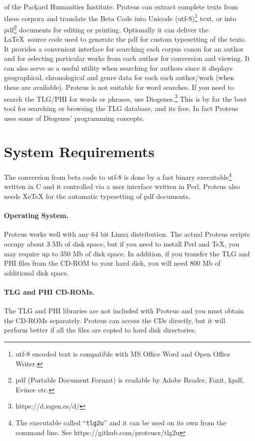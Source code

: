 \documentclass[11pt,a4paper]{article}
\begin{document}
  of the Packard Humanities Institute.
  Proteus can extract complete texts from these corpora
  and translate the Beta Code into Unicode (utf-8)\footnote{utf-8 encoded
  text is compatible with MS Office Word and Open Office Writer.}
  text, or into pdf\footnote{ pdf (Portable Document Format)
  is readable by Adobe Reader, Foxit, kpdf, Evince etc.}
  documents for editing or printing. Optionally it can deliver the \LaTeX\
  source code used to generate the pdf for custom typesetting of the texts.
  It provides a convenient
  interface for searching each corpus canon for an author and for selecting
  particular works from each author for conversion and viewing.
  It can also serve as a useful utility when searching for
  authors since it displays geographical, chronological and genre
  data for each each author/work (when these are available).
  Proteus is not suitable for word searches.  If you need to search the
  TLG/PHI for words or phrases, use
  Diogenes.\footnote{https://d.iogen.es/d/}
  This is by far the best tool for searching or browsing the TLG database,
  and its free. In fact Proteus uses some of Diogenes' programming concepts.
\section{System Requirements}
  The conversion from beta code to utf-8 is done by a fast binary
  executable\footnote{The executable called ``{\tt tlg2u}'' and it
  can be used on its own from the command line. See https://github.com/proteusx/tlg2u}
  written in C
  and it controlled via a user interface written in Perl.
  Proteus also needs XeTeX for the automatic typesetting of pdf documents.
  \paragraph{Operating System.}
  Proteus works well with any 64 bit Linux distribution.
  The actual Proteus scripts occupy about 3 Mb of disk space, but if you
  need to install Perl and \TeX{}, you may require up to 350 Mb of disk space.
  In addition, if you transfer the TLG and PHI files from the CD-ROM to
  your hard disk, you will need 800 Mb of additional disk space.
  \paragraph{TLG and PHI CD-ROMs.}
  The TLG and PHI libraries are not included with
  Proteus and you must obtain the CD-ROMs separately. Proteus can
  access the CDs directly, but it will perform better if all the files are
  copied to hard disk directories.
\end{document}
